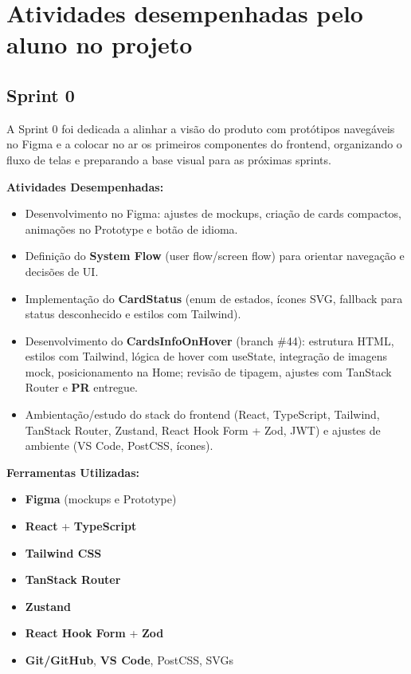 \section{Atividades desempenhadas pelo aluno no projeto}

\subsection{Sprint 0}

A Sprint 0 foi dedicada a alinhar a visão do produto com protótipos
navegáveis no Figma e a colocar no ar os primeiros componentes do
frontend, organizando o fluxo de telas e preparando a base visual para
as próximas sprints.

\textbf{Atividades Desempenhadas:}

\begin{itemize}
\item
  Desenvolvimento no Figma: ajustes de mockups, criação de cards
  compactos, animações no Prototype e botão de idioma.
\item
  Definição do \textbf{System Flow} (user flow/screen flow) para
  orientar navegação e decisões de UI.
\item
  Implementação do \textbf{CardStatus} (enum de estados, ícones SVG,
  fallback para status desconhecido e estilos com Tailwind).
\item
  Desenvolvimento do \textbf{CardsInfoOnHover} (branch \#44): estrutura
  HTML, estilos com Tailwind, lógica de hover com useState, integração
  de imagens mock, posicionamento na Home; revisão de tipagem, ajustes
  com TanStack Router e \textbf{PR} entregue.
\item
  Ambientação/estudo do stack do frontend (React, TypeScript, Tailwind,
  TanStack Router, Zustand, React Hook Form + Zod, JWT) e ajustes de
  ambiente (VS Code, PostCSS, ícones).
\end{itemize}

\textbf{Ferramentas Utilizadas:}

\begin{itemize}
\item
  \textbf{Figma} (mockups e Prototype)
\item
  \textbf{React} + \textbf{TypeScript}
\item
  \textbf{Tailwind CSS}
\item
  \textbf{TanStack Router}
\item
  \textbf{Zustand}
\item
  \textbf{React Hook Form} + \textbf{Zod}
\item
  \textbf{Git/GitHub}, \textbf{VS Code}, PostCSS, SVGs
\end{itemize}

